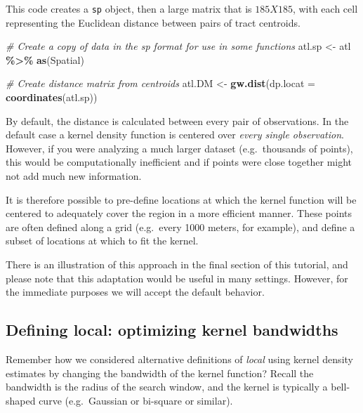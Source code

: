 \documentclass[
]{book}
\newenvironment{Shaded}{\begin{snugshade}}{\end{snugshade}}
\newcommand{\AttributeTok}[1]{\textcolor[rgb]{0.13,0.29,0.53}{#1}}
\newcommand{\CommentTok}[1]{\textcolor[rgb]{0.56,0.35,0.01}{\textit{#1}}}
\newcommand{\FunctionTok}[1]{\textcolor[rgb]{0.13,0.29,0.53}{\textbf{#1}}}
\newcommand{\NormalTok}[1]{#1}
\newcommand{\OtherTok}[1]{\textcolor[rgb]{0.56,0.35,0.01}{#1}}
\newcommand{\SpecialCharTok}[1]{\textcolor[rgb]{0.81,0.36,0.00}{\textbf{#1}}}
\newcommand{\StringTok}[1]{\textcolor[rgb]{0.31,0.60,0.02}{#1}}
\newenvironment{rmdtip}[1]
  {
  \begin{itemize}
  \renewcommand{\labelitemi}{
    \raisebox{-.7\height}[0pt][0pt]{
      {\setkeys{Gin}{width=3em,keepaspectratio}\texttt{[image: images/\#1]}}
    }
  }
  \setlength{\fboxsep}{1em}
  \begin{tip}
  \item
  }
  {
  \end{tip}
  \end{itemize}
  }
\begin{document}
This code creates a \texttt{sp} object, then a large matrix that is \(185 X 185\), with each cell representing the Euclidean distance between pairs of tract centroids.

\begin{Shaded}
\begin{Highlighting}[]
\CommentTok{\# Create a copy of data in the \textquotesingle{}sp\textquotesingle{} format for use in some functions}
\NormalTok{atl.sp }\OtherTok{\textless{}{-}}\NormalTok{ atl }\SpecialCharTok{\%\textgreater{}\%}
  \FunctionTok{as}\NormalTok{(}\StringTok{\textquotesingle{}Spatial\textquotesingle{}}\NormalTok{)}

\CommentTok{\# Create distance matrix from centroids}
\NormalTok{atl.DM }\OtherTok{\textless{}{-}} \FunctionTok{gw.dist}\NormalTok{(}\AttributeTok{dp.locat =} \FunctionTok{coordinates}\NormalTok{(atl.sp))}
\end{Highlighting}
\end{Shaded}

\begin{rmdtip}{tip}
By default, the distance is calculated between every pair of observations. In the default case a kernel density function is centered over \emph{every single observation}. However, if you were analyzing a much larger dataset (e.g.~thousands of points), this would be computationally inefficient and if points were close together might not add much new information.

It is therefore possible to pre-define locations at which the kernel function will be centered to adequately cover the region in a more efficient manner. These points are often defined along a grid (e.g.~every 1000 meters, for example), and define a subset of locations at which to fit the kernel.

There is an illustration of this approach in the final section of this tutorial, and please note that this adaptation would be useful in many settings. However, for the immediate purposes we will accept the default behavior.

\end{rmdtip}

\hypertarget{defining-local-optimizing-kernel-bandwidths}{%
\subsection{Defining local: optimizing kernel bandwidths}\label{defining-local-optimizing-kernel-bandwidths}}

Remember how we considered alternative definitions of \emph{local} using kernel density estimates by changing the bandwidth of the kernel function? Recall the bandwidth is the radius of the search window, and the kernel is typically a bell-shaped curve (e.g.~Gaussian or bi-square or similar).
\end{document}
